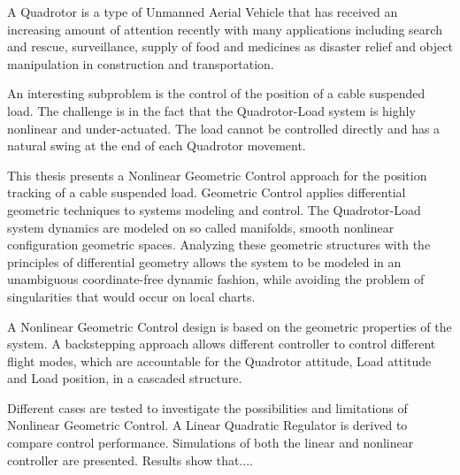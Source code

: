 
A Quadrotor is a type of Unmanned Aerial Vehicle that has received an increasing amount of attention recently with many applications including search and rescue, surveillance, supply of food and medicines as disaster relief and object manipulation in construction and transportation.

An interesting subproblem is the control of the position of a cable suspended load. The challenge is in the fact that the Quadrotor-Load system is highly nonlinear and under-actuated. The load cannot be controlled directly and has a natural swing at the end of each Quadrotor movement. 

This thesis presents a Nonlinear Geometric Control approach for the position tracking of a cable suspended load. Geometric Control applies differential geometric techniques to systems modeling and control.
The Quadrotor-Load system dynamics are modeled on so called manifolds, smooth nonlinear configuration geometric spaces. 
Analyzing these geometric structures with the principles of differential geometry allows the system to be modeled in an unambiguous coordinate-free dynamic fashion, while avoiding the problem of singularities that would occur on local charts. 

A Nonlinear Geometric Control design is based on the geometric properties of the system. A backstepping approach allows different controller to control different flight modes, which are accountable for the Quadrotor attitude, Load attitude and Load position, in a cascaded structure. 

Different cases are tested to investigate the possibilities and limitations of Nonlinear Geometric Control. A Linear Quadratic Regulator is derived to compare control performance. Simulations of both the linear and nonlinear controller are presented. 
Results show that....


%
%
%
%

